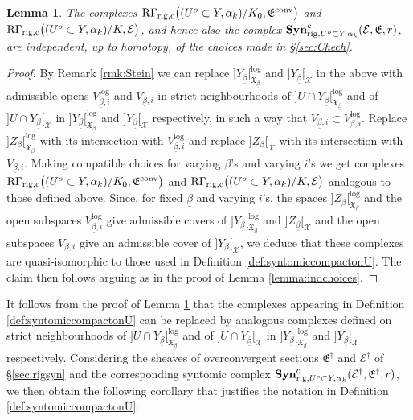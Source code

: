 \documentclass[asterisque,english]{smfart}
\newtheorem{lemma}[theo]{Lemma}
\begin{document}
\begin{lemma}\label{lemma:indchoicescompact}  The complexes $\mathrm{R\Gamma}_{\rm rig,c}\bigl( (U^o\subset Y,\alpha_k)/K_0,\mathfrak{E}^{\rm conv}\bigr)$ and $\mathrm{R\Gamma}_{\rm rig,c}\bigl( (U^o\subset Y,\alpha_k)/K ,\mathcal{E}\bigr)$, and hence also the complex $\mathbf{Syn}_{{\rm rig},U^o\subset Y, \alpha_k}^c(\mathcal{E},\mathfrak{E},r)$, are independent, up to homotopy, of the choices made in \S \ref{sec:Chech}.
\end{lemma}
\begin{proof}
By Remark \ref{rmk:Stein} we can replace $]Y_{\underline{\beta}} [_{\mathfrak{X}_{\underline{\beta}}}^{\log}$ and $]Y_{\underline{\beta}} [_{\mathcal{X}}$  in the above with admissible opens $V_{\underline{\beta},i}^{\log}$ and $V_{\underline{\beta},i}$ in strict neighbourhoods  of  $]U\cap Y_{\underline{\beta}}[_{\mathfrak{X}_{\underline{\beta}}}^{\log}$ and of $]U\cap Y_{\underline{\beta}} [_{\mathcal{X}}$ in $]Y_{\underline{\beta}} [_{\mathfrak{X}_{\underline{\beta}}}^{\log}$ and $]Y_{\underline{\beta}} [_{\mathcal{X}}$ respectively, in such a way that $V_{\underline{\beta},i}\subset V_{\underline{\beta},i}^{\log}$. Replace 
$]Z_{\underline{\beta}} [_{\mathfrak{X}_{\underline{\beta}}}^{\log}$ with its intersection with $V_{\underline{\beta},i}^{\log}$ and replace $ ]Z_{\underline{\beta}} [_{\mathcal{X}}$ with its intersection with $V_{\underline{\beta},i}$. Making compatible choices for varying $\underline{\beta}$'s and varying $i$'s we get complexes $ \mathrm{R\Gamma}_{\rm rig,c}\bigl( (U^o\subset Y,\alpha_k)/K_0,\mathfrak{E}^{\rm conv}\bigr)$ and $  \mathrm{R\Gamma}_{\rm rig,c}\bigl( (U^o\subset Y,\alpha_k)/K ,\mathcal{E}\bigr)$ analogous to those defined above.  Since, for fixed  $\underline{\beta}$ and varying $i$'s, the spaces $]Z_{\underline{\beta}} [_{\mathfrak{X}_{\underline{\beta}}}^{\log}$ and the open subspaces $V_{\underline{\beta},i}^{\log}$ give admissible covers of  $]Y_{\underline{\beta}} [_{\mathfrak{X}_{\underline{\beta}}}^{\log}$ and $ ]Z_{\underline{\beta}} [_{\mathcal{X}}$ and the open subspaces $V_{\underline{\beta},i}$ give  an admissible cover of 
$]Y_{\underline{\beta}} [_{\mathcal{X}}$, we deduce that these complexes are quasi-isomorphic to those used in Definition \ref{def:syntomiccompactonU}. The claim then follows  arguing as in the proof of Lemma \ref{lemma:indchoices}.
\end{proof}

It follows from the proof of Lemma \ref{lemma:indchoicescompact} that the complexes appearing in Definition \ref{def:syntomiccompactonU} can be replaced by analogous complexes defined on strict neighbourhoods  of  $]U\cap Y_{\underline{\beta}}[_{\mathfrak{X}_{\underline{\beta}}}^{\log}$ and of $]U\cap Y_{\underline{\beta}} [_{\mathcal{X}}$ in $]Y_{\underline{\beta}} [_{\mathfrak{X}_{\underline{\beta}}}^{\log}$ and $]Y_{\underline{\beta}} [_{\mathcal{X}}$ respectively. Considering the sheaves of overconvergent sections $\mathfrak{E}^\dagger$ and $\mathcal{E}^\dagger$  of \S\ref{sec:rigsyn} and the corresponding syntomic complex $ \mathbf{Syn}_{{\rm rig},U^o\subset Y, \alpha_k}^c(\mathcal{E}^\dagger,\mathfrak{E}^\dagger,r)$, we then obtain the following corollary that justifies the notation in Definition \ref{def:syntomiccompactonU}:
\end{document}
